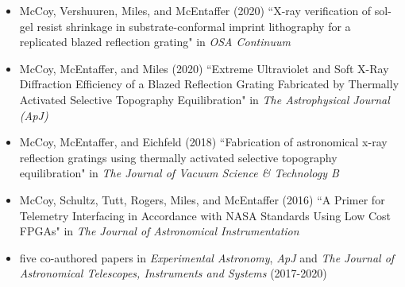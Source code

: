 \begin{itemize}[noitemsep]
 \item McCoy, Vershuuren, Miles, and McEntaffer (2020) ``X-ray verification of sol-gel resist shrinkage in substrate-conformal imprint lithography for a replicated blazed reflection grating" in \emph{OSA Continuum} \cite{McCoy20b}
 \item McCoy, McEntaffer, and Miles (2020) ``Extreme Ultraviolet and Soft X-Ray Diffraction Efficiency of a Blazed Reflection Grating Fabricated by Thermally Activated Selective Topography Equilibration" in \emph{The Astrophysical Journal (ApJ)} \cite{McCoy20}
 \item McCoy, McEntaffer, and Eichfeld (2018) ``Fabrication of astronomical x-ray reflection gratings using thermally activated selective topography equilibration" in \emph{The Journal of Vacuum Science \& Technology B} \cite{McCoy18}
 \item McCoy, Schultz, Tutt, Rogers, Miles, and McEntaffer (2016) ``A Primer for Telemetry Interfacing in Accordance with NASA Standards Using Low Cost FPGAs" in \emph{The Journal of Astronomical Instrumentation} \cite{McCoy_telemetry}
 \item five co-authored papers in \emph{Experimental Astronomy}, \emph{ApJ} and \emph{The Journal of Astronomical Telescopes, Instruments and Systems} (2017-2020) \cite{Rogers17,Miles18,Miles19,Rogers20,McCurdy20}
 \end{itemize}
